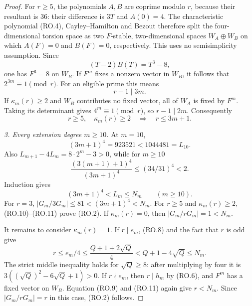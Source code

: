 \documentclass[11pt,a4paper]{article}
\begin{document}
\begin{proof}
For $r\ge5$, the polynomials $A,B$ are coprime modulo $r$,
because their resultant is $36$: their difference is $3T$
and $A(0)=4$.
The characteristic polynomial (RO.4), Cayley--Hamilton and
Bezout therefore split the four-dimensional torsion space
as two $F$-stable, two-dimensional spaces
$W_A\oplus W_B$ on which $A(F)=0$ and $B(F)=0$,
respectively.  This uses no semisimplicity assumption.
Since
\[
                         (T-2)B(T)=T^3-8,
\]
one has $F^3=8$ on $W_B$.
If $F^m$ fixes a nonzero vector in $W_B$, it follows that
$2^{3m}\equiv1\pmod r$.
For an eligible prime this means
\[
                              r-1\mid3m.
\tag{RO.9}
\]
If $\kappa_m(r)\ge2$ and $W_B$ contributes no fixed
vector, all of $W_A$ is fixed by $F^m$.
Taking its determinant gives $4^m\equiv1\pmod r$,
so $r-1\mid2m$.
Consequently
\[
 r\ge5,\quad\kappa_m(r)\ge2
                  \quad\Longrightarrow\quad r\le3m+1.
\tag{RO.10}
\]

\emph{3. Every extension degree $m\ge10$.}
At $m=10$,
\[
       (3m+1)^4=923521<1044481=L_{10}.
\]
Also
$L_{m+1}-4L_m=8\cdot2^m-3>0$, while for $m\ge10$
\[
 \frac{(3(m+1)+1)^4}{(3m+1)^4}
          \le(34/31)^4<2.
\]
Induction gives
\[
                            (3m+1)^4<L_m\le N_m
                            \qquad(m\ge10).
\tag{RO.11}
\]
For $r=3$, $|G_m/3G_m|\le81<(3m+1)^4<N_m$.
For $r\ge5$ and $\kappa_m(r)\ge2$, (RO.10)--(RO.11)
prove (RO.2).  If $\kappa_m(r)=0$, then
$|G_m/rG_m|=1<N_m$.

It remains to consider $\kappa_m(r)=1$.
If $r\mid e_m$, (RO.8) and the fact that $r$ is odd give
\[
 r\le e_m/4\le\frac{Q+1+2\sqrt Q}{4}
                    <Q+1-4\sqrt Q\le N_m.
\tag{RO.12}
\]
The strict middle inequality holds for $\sqrt Q\ge8$:
after multiplying by four it is
$3((\sqrt Q)^2-6\sqrt Q+1)>0$.
If $r\nmid e_m$, then $r\mid h_m$ by (RO.6), and
$F^m$ has a fixed vector on $W_B$.
Equation (RO.9) and (RO.11) again give $r<N_m$.
Since $|G_m/rG_m|=r$ in this case, (RO.2) follows.


\end{proof}
\end{document}
